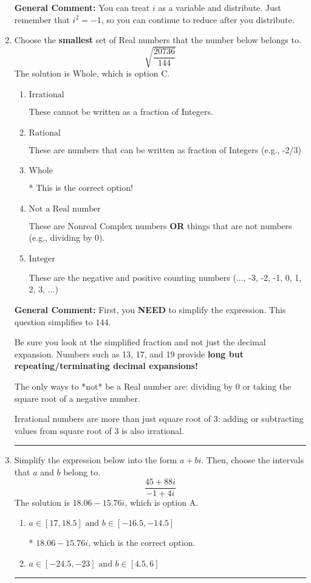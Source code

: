 \documentclass{extbook}[14pt]
\newcommand{\litem}[1]{\item #1

\rule{\textwidth}{0.4pt}}
\begin{document}
\begin{enumerate}
{\textbf{General Comment:} You can treat $i$ as a variable and distribute. Just remember that $i^2=-1$, so you can continue to reduce after you distribute.
}
\litem{
Choose the \textbf{smallest} set of Real numbers that the number below belongs to.
\[ \sqrt{\frac{20736}{144}} \]
The solution is \( \text{Whole} \), which is option C.\begin{enumerate}[label=\Alph*.]
\item \( \text{Irrational} \)

These cannot be written as a fraction of Integers.
\item \( \text{Rational} \)

These are numbers that can be written as fraction of Integers (e.g., -2/3)
\item \( \text{Whole} \)

* This is the correct option!
\item \( \text{Not a Real number} \)

These are Nonreal Complex numbers \textbf{OR} things that are not numbers (e.g., dividing by 0).
\item \( \text{Integer} \)

These are the negative and positive counting numbers (..., -3, -2, -1, 0, 1, 2, 3, ...)
\end{enumerate}

\textbf{General Comment:} First, you \textbf{NEED} to simplify the expression. This question simplifies to $144$. 
 
 Be sure you look at the simplified fraction and not just the decimal expansion. Numbers such as 13, 17, and 19 provide \textbf{long but repeating/terminating decimal expansions!} 
 
 The only ways to *not* be a Real number are: dividing by 0 or taking the square root of a negative number. 
 
 Irrational numbers are more than just square root of 3: adding or subtracting values from square root of 3 is also irrational.
}
\litem{
Simplify the expression below into the form $a+bi$. Then, choose the intervals that $a$ and $b$ belong to.
\[ \frac{45 + 88 i}{-1 + 4 i} \]
The solution is \( 18.06  - 15.76 i \), which is option A.\begin{enumerate}[label=\Alph*.]
\item \( a \in [17, 18.5] \text{ and } b \in [-16.5, -14.5] \)

* $18.06  - 15.76 i$, which is the correct option.
\item \( a \in [-24.5, -23] \text{ and } b \in [4.5, 6] \)


\end{enumerate}}
\end{enumerate}
\end{document}
